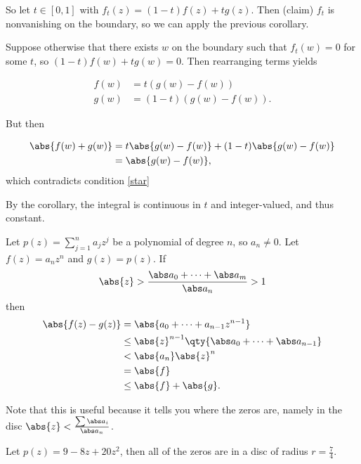 So let \(t\in [0, 1]\) with \(f_t(z) = (1-t)f(z) + t g(z)\). Then
(claim) \(f_t\) is nonvanishing on the boundary, so we can apply the
previous corollary.

Suppose otherwise that there exists \(w\) on the boundary such that
\(f_t(w) = 0\) for some \(t\), so \((1-t)f(w) + tg(w) = 0\). Then
rearranging terms yields

\begin{align*}
  f(w) &= t(g(w) - f(w)) \\
  g(w) &= (1-t)(g(w) - f(w))
  .\end{align*}

But then

\begin{align*}
  \abs{f(w) + g(w)}
  &= t\abs{g(w) - f(w)} + (1-t) \abs{g(w) - f(w)} \\
  &= \abs{g(w) - f(w)}
  ,\end{align*} which contradicts condition \ref{star}

By the corollary, the integral is continuous in \(t\) and
integer-valued, and thus constant.

\begin{description}
\tightlist
\item[Corollary (Fundamental Theorem of Algebra)]
Let \(p(z) = \sum_{j=1}^n a_j z^j\) be a polynomial of degree \(n\), so
\(a_n \neq 0\). Let \(f(z) = a_n z^n\) and \(g(z) = p(z)\). If
\begin{align*}
  \abs{z} > \frac{\abs a_0 + \cdots + \abs a_m}{\abs a_n} > 1
  \end{align*} then \begin{align*}
  \abs{f(z) - g(z)}
  &= \abs{ a_0 + \cdots + a_{n-1}z^{n-1} }\\
  &\leq \abs{z}^{n-1} \qty{ \abs a_0 + \cdots + \abs a_{n-1} } \\
  &< \abs{a_n} \abs{z}^n \\
  &= \abs{f} \\
  &\leq \abs{f} + \abs{g}
  .\end{align*}
\end{description}

Note that this is useful because it tells you where the zeros are,
namely in the disc \(\abs{z} < \frac{\sum \abs a_i}{\abs a_n}\).

\begin{description}
\tightlist
\item[Example]
Let \(p(z) = 9 - 8 z + 20z^2\), then all of the zeros are in a disc of
radius \(r = \frac 7 4\).
\end{description}

